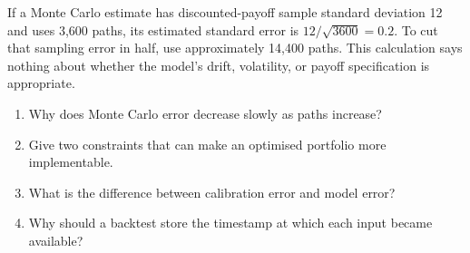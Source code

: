 \begin{worked}
If a Monte Carlo estimate has discounted-payoff sample standard deviation 12 and uses 3,600 paths, its estimated standard error is $12/\sqrt{3600}=0.2$. To cut that sampling error in half, use approximately 14,400 paths. This calculation says nothing about whether the model's drift, volatility, or payoff specification is appropriate.
\end{worked}

\begin{exerciseblock}
\begin{enumerate}
  \item Why does Monte Carlo error decrease slowly as paths increase?
  \item Give two constraints that can make an optimised portfolio more implementable.
  \item What is the difference between calibration error and model error?
  \item Why should a backtest store the timestamp at which each input became available?
\end{enumerate}
\end{exerciseblock}

